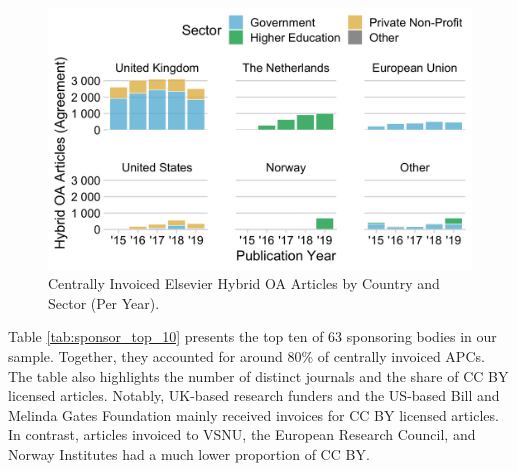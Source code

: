 \documentclass[a4paper,man,floatsintext,longtable,noextraspace,12pt]{apa6}
\begin{document}
\begin{figure}[H]

{\centering \includegraphics[width=0.7\linewidth,]{manuscript_files/figure-latex/sponsor_sector-1} 

}

\caption{Centrally Invoiced Elsevier Hybrid OA Articles by Country and Sector (Per Year).}\label{fig:sponsor_sector}
\end{figure}

Table \ref{tab:sponsor_top_10} presents the top ten of 63 sponsoring
bodies in our sample. Together, they accounted for around 80\% of
centrally invoiced APCs. The table also highlights the number of
distinct journals and the share of CC BY licensed articles. Notably,
UK-based research funders and the US-based Bill and Melinda Gates
Foundation mainly received invoices for CC BY licensed articles. In
contrast, articles invoiced to VSNU, the European Research Council, and
Norway Institutes had a much lower proportion of CC BY.
\end{document}

